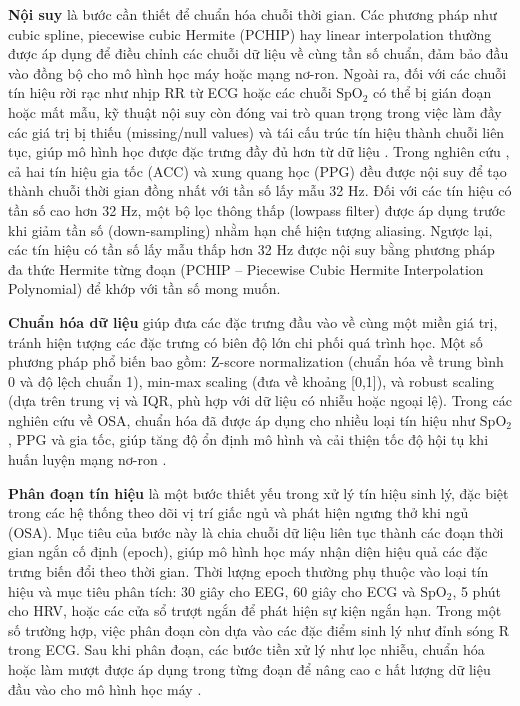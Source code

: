 \textbf{Nội suy}
là bước cần thiết để chuẩn hóa chuỗi thời gian. Các phương pháp như 
cubic spline, piecewise cubic Hermite (PCHIP) hay linear interpolation 
thường được áp dụng để điều chỉnh các chuỗi dữ liệu về cùng tần số chuẩn, 
đảm bảo đầu vào đồng bộ cho mô hình học máy hoặc mạng nơ-ron. 
Ngoài ra, đối với các chuỗi tín hiệu rời rạc như nhịp RR từ ECG 
hoặc các chuỗi $\mathrm{SpO_2}$ có thể bị gián đoạn hoặc mất mẫu, 
kỹ thuật nội suy còn đóng vai trò quan trọng trong việc làm đầy các 
giá trị bị thiếu (missing/null values) và tái cấu trúc tín hiệu thành 
chuỗi liên tục, giúp mô hình học được đặc trưng đầy đủ hơn từ 
dữ liệu \cite{zou2024mbtcn}. 
Trong nghiên cứu \cite{olsen2024transfer}, 
cả hai tín hiệu gia tốc (ACC) và xung quang học (PPG) 
đều được nội suy để tạo thành chuỗi thời gian đồng nhất với 
tần số lấy mẫu 32 Hz. 
Đối với các tín hiệu có tần số cao hơn 32 Hz, 
một bộ lọc thông thấp (lowpass filter) được áp dụng trước khi giảm 
tần số (down-sampling) nhằm hạn chế hiện tượng aliasing. 
Ngược lại, các tín hiệu có tần số lấy mẫu thấp hơn 32 Hz được 
nội suy bằng phương pháp đa thức Hermite từng đoạn 
(PCHIP – Piecewise Cubic Hermite Interpolation Polynomial) 
để khớp với tần số mong muốn.

\textbf{Chuẩn hóa dữ liệu}  giúp đưa các đặc trưng đầu vào về cùng một miền giá trị, 
tránh hiện tượng các đặc trưng có biên độ lớn chi phối quá trình học. 
Một số phương pháp phổ biến bao gồm: Z-score normalization 
(chuẩn hóa về trung bình 0 và độ lệch chuẩn 1), 
min-max scaling (đưa về khoảng [0,1]), và robust scaling 
(dựa trên trung vị và IQR, phù hợp với dữ liệu có nhiễu hoặc ngoại lệ). 
Trong các nghiên cứu về OSA, chuẩn hóa đã được áp dụng cho nhiều 
loại tín hiệu như $\mathrm{SpO_2}$, PPG và gia tốc, giúp tăng độ ổn định 
mô hình và cải thiện tốc độ hội tụ khi huấn luyện mạng nơ-ron 
\cite{Sleep_Posture_Detection, Vu2025SleepPosition, rossi2023sleep}.

\textbf{Phân đoạn tín hiệu} là một bước thiết yếu trong xử lý tín 
hiệu sinh lý, đặc biệt trong các hệ thống theo dõi vị trí giấc ngủ và phát 
hiện ngưng thở khi ngủ (OSA). Mục tiêu của bước này là chia chuỗi dữ 
liệu liên tục thành các đoạn thời gian ngắn cố định (epoch), 
giúp mô hình học máy nhận diện hiệu quả các đặc trưng biến đổi theo 
thời gian. Thời lượng epoch thường phụ thuộc vào loại tín hiệu và 
mục tiêu phân tích: 30 giây cho EEG, 60 giây cho ECG và $\mathrm{SpO_2}$, 
5 phút cho HRV, hoặc các cửa sổ trượt ngắn để phát hiện sự kiện ngắn hạn. 
Trong một số trường hợp, việc phân đoạn còn dựa vào các đặc điểm sinh lý 
như đỉnh sóng R trong ECG. Sau khi phân đoạn, các bước tiền xử lý như lọc nhiễu, 
chuẩn hóa hoặc làm mượt được áp dụng trong từng đoạn để nâng cao c
hất lượng dữ liệu đầu vào cho mô hình học máy 
\cite{Sleep_Posture_Detection, Vu2025SleepPosition, HOANG2025116309, zou2024mbtcn, osa_sanchez2025}.

